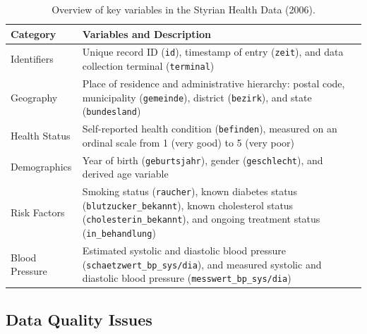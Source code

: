 \begin{table}[h]
    \centering
    \caption{Overview of key variables in the Styrian Health Data (2006).}
    \label{tab:variables}
    \begin{tabular}{p{} p{}}
        \toprule
        \textbf{Category} & \textbf{Variables and Description} \\
        \midrule

        Identifiers &
        Unique record ID (\texttt{id}), timestamp of entry (\texttt{zeit}), and data collection terminal (\texttt{terminal}) \\

        \addlinespace

        Geography &
        Place of residence and administrative hierarchy: postal code, municipality (\texttt{gemeinde}), district (\texttt{bezirk}), and state (\texttt{bundesland}) \\

        \addlinespace

        Health Status &
        Self-reported health condition (\texttt{befinden}), measured on an ordinal scale from 1 (very good) to 5 (very poor) \\

        \addlinespace

        Demographics &
        Year of birth (\texttt{geburtsjahr}), gender (\texttt{geschlecht}), and derived age variable \\

        \addlinespace

        Risk Factors &
        Smoking status (\texttt{raucher}), known diabetes status (\texttt{blutzucker\_bekannt}), known cholesterol status (\texttt{cholesterin\_bekannt}), and ongoing treatment status (\texttt{in\_behandlung}) \\

        \addlinespace

        Blood Pressure &
        Estimated systolic and diastolic blood pressure (\texttt{schaetzwert\_bp\_sys/dia}), and measured systolic and diastolic blood pressure (\texttt{messwert\_bp\_sys/dia}) \\

        \bottomrule
    \end{tabular}
\end{table}

\subsection{Data Quality Issues}

